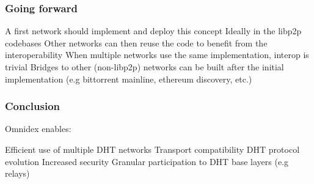 \documentclass{../shipyard-slide}
\begin{document}
\begin{frame}
\frametitle{Going forward}

\begin{itemize}
	\itemc A first network should implement and deploy this concept
	\itemc Ideally in the libp2p codebases
	\itemc Other networks can then reuse the code to benefit from the interoperability
	\itemc When multiple networks use the same implementation, interop is trivial
	\itemc Bridges to other (non-libp2p) networks can be built after the initial implementation (e.g bittorrent mainline, ethereum discovery, etc.)
\end{itemize}
\end{frame}

\begin{frame}
\frametitle{Conclusion}

Omnidex enables:
\begin{itemize}
	\itemc Efficient use of multiple DHT networks
	\itemc Transport compatibility
	\itemc DHT protocol evolution
	\itemc Increased security
	\itemc Granular participation to DHT base layers (e.g relays)
\end{itemize}
\end{frame}
\end{document}
